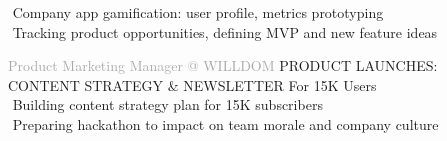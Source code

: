 \begin{cvtable}
{%
     \textperiodcentered $ $ Company app gamification: user profile, metrics prototyping \\
     \textperiodcentered $ $ Tracking product opportunities, defining MVP and new feature ideas \\
}

{\textcolor{darkgray}{%
    Product Marketing Manager
    \newline @
{W\scriptsize ILL}{D\scriptsize OM}
    }}%
{
}%
{%
{\scriptsize PRODUCT LAUNCHES:
CONTENT STRATEGY
\&
NEWSLETTER
For %
15K Users
} \\
    \textperiodcentered $ $ Building content strategy plan
    for 15K subscribers \\
    \textperiodcentered $ $ Preparing hackathon to impact on team morale and company culture \\
} 


\end{cvtable}
